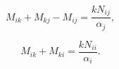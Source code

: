 

$$M_{ik} + M_{kj} - M_{ij} = \frac{kN_{ij}}{\alpha_j},$$

$$M_{ik} + M_{ki} = \frac{kN_{ii}}{\alpha_i}.$$
